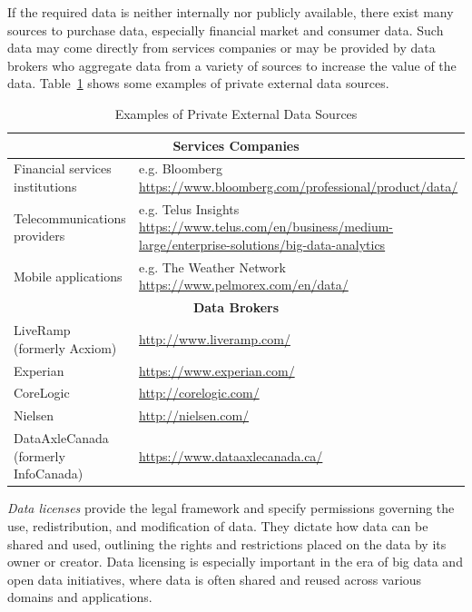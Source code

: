 If the required data is neither internally nor publicly available, there exist many sources to purchase data, especially financial market and consumer data. Such data may come directly from services companies or may be provided by data brokers who aggregate data from a variety of sources to increase the value of the data. Table~\ref{tab:privateexternal} shows some examples of private external data sources.

\begin{table}
\renewcommand{\arraystretch}{1.5}
\scriptsize

\begin{tabularx}{\linewidth}{l|X} \hline
\multicolumn{2}{c}{\textbf{Services Companies}} \\ \hline
Financial services institutions & e.g. Bloomberg {\footnotesize \url{https://www.bloomberg.com/professional/product/data/}} \\
Telecommunications providers & e.g. Telus Insights {\footnotesize \url{https://www.telus.com/en/business/medium-large/enterprise-solutions/big-data-analytics}} \\
Mobile applications & e.g. The Weather Network {\footnotesize \url{https://www.pelmorex.com/en/data/}} \\ \hline
\multicolumn{2}{c}{\textbf{Data Brokers}} \\ \hline
LiveRamp (formerly Acxiom) & {\footnotesize \url{http://www.liveramp.com/}} \\
Experian & {\footnotesize \url{https://www.experian.com/}} \\ 
CoreLogic & {\footnotesize \url{http://corelogic.com/}} \\
Nielsen & {\footnotesize \url{http://nielsen.com/}} \\
DataAxleCanada (formerly InfoCanada) & {\footnotesize \url{https://www.dataaxlecanada.ca/}} \\ \hline
\end{tabularx}
\caption{Examples of Private External Data Sources}
\label{tab:privateexternal}
\end{table}

\emph{Data licenses} provide the legal framework and specify permissions governing the use, redistribution, and modification of data. They dictate how data can be shared and used, outlining the rights and restrictions placed on the data by its owner or creator. Data licensing is especially important in the era of big data and open data initiatives, where data is often shared and reused across various domains and applications.

